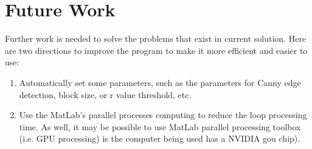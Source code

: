 \chapter{Future Work}

Further work is needed to solve the problems that exist in current solution. 
Here are two directions to improve the program to make it more efficient and
easier to use:
\begin{enumerate}
\item Automatically set some parameters, such as the parameters for Canny edge detection, block size, or r value threshold, etc. 
\item Use the MatLab’s parallel processes computing to reduce the loop processing time. 
As well, it may be possible to use MatLab parallel processing toolbox 
(i.e. GPU processing) is the computer being used has a NVIDIA gou chip).
\end{enumerate}
